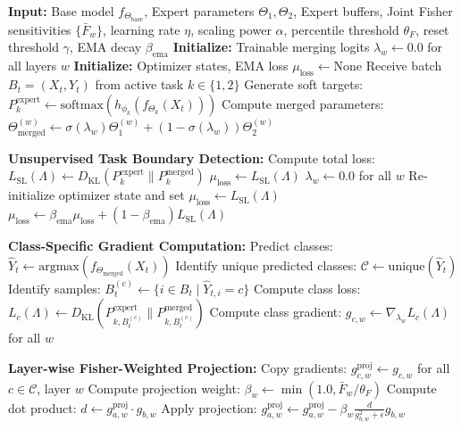 \documentclass{article}
\theoremstyle{plain}
\theoremstyle{definition}
\theoremstyle{remark}
\begin{document}
\begin{algorithm}[h]
\caption{Layer-wise Fisher-Weighted Gradient Projection (LF-Proj)}
\label{alg:lfproj}
\begin{algorithmic}[1]
\STATE \textbf{Input:} Base model $f_{\Theta_{\text{base}}}$, Expert parameters $\Theta_1, \Theta_2$, Expert buffers, Joint Fisher sensitivities $\{\bar{F}_w\}$, learning rate $\eta$, scaling power $\alpha$, percentile threshold $\theta_F$, reset threshold $\gamma$, EMA decay $\beta_{\text{ema}}$
\STATE \textbf{Initialize:} Trainable merging logits $\lambda_w \leftarrow 0.0$ for all layers $w$
\STATE \textbf{Initialize:} Optimizer states, EMA loss $\mu_{\text{loss}} \leftarrow \text{None}$
    \STATE Receive batch $B_t = (X_t, Y_t)$ from active task $k \in \{1, 2\}$
    \STATE Generate soft targets: $P^{\text{expert}}_k \leftarrow \text{softmax}(h_{\phi_k}(f_{\Theta_k}(X_t)))$
    \STATE Compute merged parameters: $\Theta_{\text{merged}}^{(w)} \leftarrow \sigma(\lambda_w) \Theta_1^{(w)} + (1 - \sigma(\lambda_w)) \Theta_2^{(w)}$
    
    \STATE \textbf{Unsupervised Task Boundary Detection:}
    \STATE Compute total loss: $L_{\text{SL}}(\Lambda) \leftarrow D_{\text{KL}}(P^{\text{expert}}_k \parallel P^{\text{merged}}_k)$
        \STATE $\mu_{\text{loss}} \leftarrow L_{\text{SL}}(\Lambda)$
        \STATE $\lambda_w \leftarrow 0.0$ for all $w$ 
        \STATE Re-initialize optimizer state and set $\mu_{\text{loss}} \leftarrow L_{\text{SL}}(\Lambda)$
    \ELSE
        \STATE $\mu_{\text{loss}} \leftarrow \beta_{\text{ema}} \mu_{\text{loss}} + (1 - \beta_{\text{ema}}) L_{\text{SL}}(\Lambda)$
    \ENDIF
    
    \STATE \textbf{Class-Specific Gradient Computation:}
    \STATE Predict classes: $\hat{Y}_t \leftarrow \text{argmax}(f_{\Theta_{\text{merged}}}(X_t))$
    \STATE Identify unique predicted classes: $\mathcal{C} \leftarrow \text{unique}(\hat{Y}_t)$
        \STATE Identify samples: $B_t^{(c)} \leftarrow \{i \in B_t \mid \hat{Y}_{t, i} = c\}$
        \STATE Compute class loss: $L_c(\Lambda) \leftarrow D_{\text{KL}}(P^{\text{expert}}_{k, B_t^{(c)}} \parallel P^{\text{merged}}_{k, B_t^{(c)}})$
        \STATE Compute class gradient: $g_{c, w} \leftarrow \nabla_{\lambda_w} L_c(\Lambda)$ for all $w$
    \ENDFOR
    
    \STATE \textbf{Layer-wise Fisher-Weighted Projection:}
    \STATE Copy gradients: $g^{\text{proj}}_{c, w} \leftarrow g_{c, w}$ for all $c \in \mathcal{C}$, layer $w$
            \STATE Compute projection weight: $\beta_w \leftarrow \min\left(1.0, \bar{F}_w / \theta_F\right)$
            \STATE Compute dot product: $d \leftarrow g^{\text{proj}}_{a, w} \cdot g_{b, w}$
                \STATE Apply projection: $g^{\text{proj}}_{a, w} \leftarrow g^{\text{proj}}_{a, w} - \beta_w \frac{d}{g_{b, w}^2 + \epsilon} g_{b, w}$
            \ENDIF
        \ENDFOR
    \ENDFOR
    

\end{algorithmic}
\end{algorithm}
\end{document}
